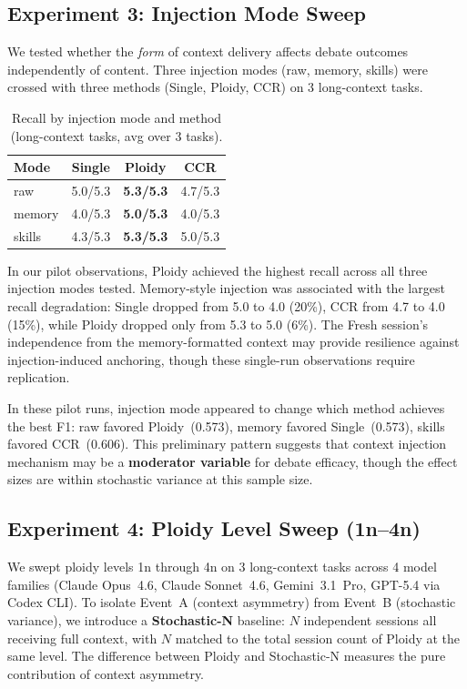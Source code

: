 \documentclass[11pt]{article}
\begin{document}
\subsection{Experiment 3: Injection Mode Sweep}
\label{sec:injection-sweep}

We tested whether the \emph{form} of context delivery affects debate outcomes independently of content. Three injection modes (raw, memory, skills) were crossed with three methods (Single, Ploidy, CCR) on 3 long-context tasks.

\begin{table}[H]
\centering
\caption{Recall by injection mode and method (long-context tasks, avg over 3 tasks).}
\label{tab:injection-recall}
\small
\begin{tabular}{@{}lccc@{}}
\toprule
\textbf{Mode} & \textbf{Single} & \textbf{Ploidy} & \textbf{CCR} \\
\midrule
raw    & 5.0/5.3 & \textbf{5.3/5.3} & 4.7/5.3 \\
memory & 4.0/5.3 & \textbf{5.0/5.3} & 4.0/5.3 \\
skills & 4.3/5.3 & \textbf{5.3/5.3} & 5.0/5.3 \\
\bottomrule
\end{tabular}
\end{table}

In our pilot observations, Ploidy achieved the highest recall across all three injection modes tested. Memory-style injection was associated with the largest recall degradation: Single dropped from 5.0 to 4.0 (20\%), CCR from 4.7 to 4.0 (15\%), while Ploidy dropped only from 5.3 to 5.0 (6\%). The Fresh session's independence from the memory-formatted context may provide resilience against injection-induced anchoring, though these single-run observations require replication.

In these pilot runs, injection mode appeared to change which method achieves the best F1: raw favored Ploidy~(0.573), memory favored Single~(0.573), skills favored CCR~(0.606). This preliminary pattern suggests that context injection mechanism may be a \textbf{moderator variable} for debate efficacy, though the effect sizes are within stochastic variance at this sample size.

\subsection{Experiment 4: Ploidy Level Sweep (1n--4n)}
\label{sec:ploidy-sweep}

We swept ploidy levels 1n through 4n on 3 long-context tasks across 4 model families (Claude Opus~4.6, Claude Sonnet~4.6, Gemini~3.1~Pro, GPT-5.4 via Codex CLI). To isolate Event~A (context asymmetry) from Event~B (stochastic variance), we introduce a \textbf{Stochastic-N} baseline: $N$ independent sessions all receiving full context, with $N$ matched to the total session count of Ploidy at the same level. The difference between Ploidy and Stochastic-N measures the pure contribution of context asymmetry.
\end{document}
